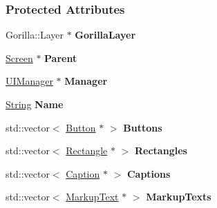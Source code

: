 \subsubsection*{Protected Attributes}
\begin{DoxyCompactItemize}
\item 
\hypertarget{classphys_1_1UI_1_1Layer_a2070c97455f89015d36f2c84f4153369}{
Gorilla::Layer $\ast$ {\bfseries GorillaLayer}}
\label{dd/d5b/classphys_1_1UI_1_1Layer_a2070c97455f89015d36f2c84f4153369}

\item 
\hypertarget{classphys_1_1UI_1_1Layer_a1339f7386d3540d6025417d3d2d5c6e3}{
\hyperlink{classphys_1_1UI_1_1Screen}{Screen} $\ast$ {\bfseries Parent}}
\label{dd/d5b/classphys_1_1UI_1_1Layer_a1339f7386d3540d6025417d3d2d5c6e3}

\item 
\hypertarget{classphys_1_1UI_1_1Layer_a7f735d502a8673b9faff0cbe773392c5}{
\hyperlink{classphys_1_1UIManager}{UIManager} $\ast$ {\bfseries Manager}}
\label{dd/d5b/classphys_1_1UI_1_1Layer_a7f735d502a8673b9faff0cbe773392c5}

\item 
\hypertarget{classphys_1_1UI_1_1Layer_a0e543975ce2486ef466f3a6a2200d717}{
\hyperlink{namespacephys_aa03900411993de7fbfec4789bc1d392e}{String} {\bfseries Name}}
\label{dd/d5b/classphys_1_1UI_1_1Layer_a0e543975ce2486ef466f3a6a2200d717}

\item 
\hypertarget{classphys_1_1UI_1_1Layer_a2d12e01d6a76ad0a101022fee53a79b7}{
std::vector$<$ \hyperlink{classphys_1_1UI_1_1Button}{Button} $\ast$ $>$ {\bfseries Buttons}}
\label{dd/d5b/classphys_1_1UI_1_1Layer_a2d12e01d6a76ad0a101022fee53a79b7}

\item 
\hypertarget{classphys_1_1UI_1_1Layer_a4202cdc63f923bb1e54989fedd1d98bc}{
std::vector$<$ \hyperlink{classphys_1_1UI_1_1Rectangle}{Rectangle} $\ast$ $>$ {\bfseries Rectangles}}
\label{dd/d5b/classphys_1_1UI_1_1Layer_a4202cdc63f923bb1e54989fedd1d98bc}

\item 
\hypertarget{classphys_1_1UI_1_1Layer_a758d8888e65e3f2c6ebd83acc9e93cb2}{
std::vector$<$ \hyperlink{classphys_1_1UI_1_1Caption}{Caption} $\ast$ $>$ {\bfseries Captions}}
\label{dd/d5b/classphys_1_1UI_1_1Layer_a758d8888e65e3f2c6ebd83acc9e93cb2}

\item 
\hypertarget{classphys_1_1UI_1_1Layer_acb81eeceade2327d972cb8c91dfa31db}{
std::vector$<$ \hyperlink{classphys_1_1UI_1_1MarkupText}{MarkupText} $\ast$ $>$ {\bfseries MarkupTexts}}
\label{dd/d5b/classphys_1_1UI_1_1Layer_acb81eeceade2327d972cb8c91dfa31db}


\end{DoxyCompactItemize}
